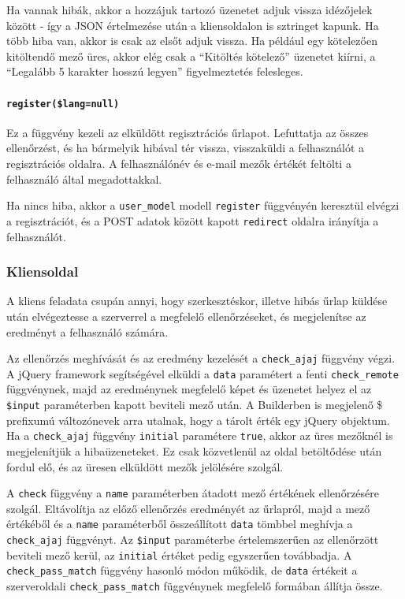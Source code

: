 \documentclass[12pt,a4paper,twoside]{article}
\begin{document}
Ha vannak hibák, akkor a hozzájuk tartozó üzenetet adjuk vissza idézőjelek
között - így a JSON értelmezése után a kliensoldalon is sztringet kapunk. Ha
több hiba van, akkor is csak az elsőt adjuk vissza. Ha például egy kötelezően
kitöltendő mező üres, akkor elég csak a ``Kitöltés kötelező'' üzenetet kiírni, a
``Legalább 5 karakter hosszú legyen'' figyelmeztetés felesleges.


\paragraph{\texttt{register(\$lang=null)}}
Ez a függvény kezeli az elküldött regisztrációs űrlapot. Lefuttatja az összes
ellenőrzést, és ha bármelyik hibával tér vissza, visszaküldi a felhasználót a
regisztrációs oldalra. A felhasználónév és e-mail mezők értékét feltölti a
felhasználó által megadottakkal.

Ha nincs hiba, akkor a \texttt{user\_model} modell \texttt{register} függvényén keresztül
elvégzi a regisztrációt, és a POST adatok között kapott \texttt{redirect} oldalra
irányítja a felhasználót.


\subsubsection{Kliensoldal}
\label{sec:reg-client}

A kliens feladata csupán annyi, hogy szerkesztéskor, illetve hibás űrlap küldése
után elvégeztesse a szerverrel a megfelelő ellenőrzéseket, és megjelenítse az
eredményt a felhasználó számára.

Az ellenőrzés meghívását és az eredmény kezelését a \texttt{check\_ajaj}
függvény végzi. A jQuery framework segítségével elküldi a \texttt{data}
paramétert a fenti \texttt{check\_remote} függvénynek, majd az eredménynek
megfelelő képet és üzenetet helyez el az \texttt{\$input} paraméterben kapott
beviteli mező után. A Builderben is megjelenő \$ prefixumú változónevek arra
utalnak, hogy a tárolt érték egy jQuery objektum. Ha a \texttt{check\_ajaj}
függvény \texttt{initial} paramétere \texttt{true}, akkor az üres mezőknél is
megjelenítjük a hibaüzeneteket. Ez csak közvetlenül az oldal betöltődése után
fordul elő, és az üresen elküldött mezők jelölésére szolgál.

A \texttt{check} függvény a \texttt{name} paraméterben átadott mező értékének
ellenőrzésére szolgál. Eltávolítja az előző ellenőrzés eredményét az
űrlapról, majd a mező értékéből és a \texttt{name} paraméterből összeállított
\texttt{data} tömbbel meghívja a \texttt{check\_ajaj} függvényt. Az
\texttt{\$input} paraméterbe értelemszerűen az ellenőrzött beviteli mező kerül,
az \texttt{initial} értéket pedig egyszerűen továbbadja. A
\texttt{check\_pass\_match} függvény hasonló módon működik, de \texttt{data}
értékeit a szerveroldali \texttt{check\_pass\_match} függvénynek megfelelő
formában állítja össze.
\end{document}
